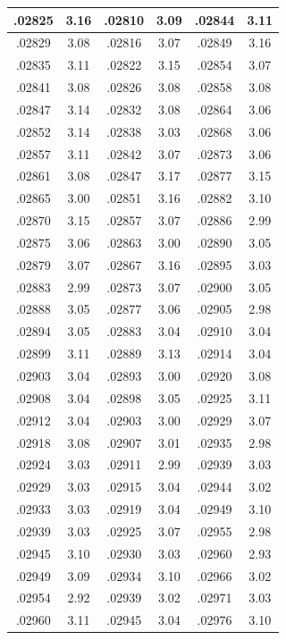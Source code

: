 \documentclass[10pt,twoside]{report}
\begin{document}
\begin{appendices}
\begin{longtable}{|c|c||c|c||c|c|}
.02825 & 3.16 & .02810 & 3.09 & .02844 & 3.11\\\hline
.02829 & 3.08 & .02816 & 3.07 & .02849 & 3.16\\\hline
.02835 & 3.11 & .02822 & 3.15 & .02854 & 3.07\\\hline
.02841 & 3.08 & .02826 & 3.08 & .02858 & 3.08\\\hline
.02847 & 3.14 & .02832 & 3.08 & .02864 & 3.06\\\hline
.02852 & 3.14 & .02838 & 3.03 & .02868 & 3.06\\\hline
.02857 & 3.11 & .02842 & 3.07 & .02873 & 3.06\\\hline
.02861 & 3.08 & .02847 & 3.17 & .02877 & 3.15\\\hline
.02865 & 3.00 & .02851 & 3.16 & .02882 & 3.10\\\hline
.02870 & 3.15 & .02857 & 3.07 & .02886 & 2.99\\\hline
.02875 & 3.06 & .02863 & 3.00 & .02890 & 3.05\\\hline
.02879 & 3.07 & .02867 & 3.16 & .02895 & 3.03\\\hline
.02883 & 2.99 & .02873 & 3.07 & .02900 & 3.05\\\hline
.02888 & 3.05 & .02877 & 3.06 & .02905 & 2.98\\\hline
.02894 & 3.05 & .02883 & 3.04 & .02910 & 3.04\\\hline
.02899 & 3.11 & .02889 & 3.13 & .02914 & 3.04\\\hline
.02903 & 3.04 & .02893 & 3.00 & .02920 & 3.08\\\hline
.02908 & 3.04 & .02898 & 3.05 & .02925 & 3.11\\\hline
.02912 & 3.04 & .02903 & 3.00 & .02929 & 3.07\\\hline
.02918 & 3.08 & .02907 & 3.01 & .02935 & 2.98\\\hline
.02924 & 3.03 & .02911 & 2.99 & .02939 & 3.03\\\hline
.02929 & 3.03 & .02915 & 3.04 & .02944 & 3.02\\\hline
.02933 & 3.03 & .02919 & 3.04 & .02949 & 3.10\\\hline
.02939 & 3.03 & .02925 & 3.07 & .02955 & 2.98\\\hline
.02945 & 3.10 & .02930 & 3.03 & .02960 & 2.93\\\hline
.02949 & 3.09 & .02934 & 3.10 & .02966 & 3.02\\\hline
.02954 & 2.92 & .02939 & 3.02 & .02971 & 3.03\\\hline
.02960 & 3.11 & .02945 & 3.04 & .02976 & 3.10\\\hline

\end{longtable}
\end{appendices}
\end{document}

